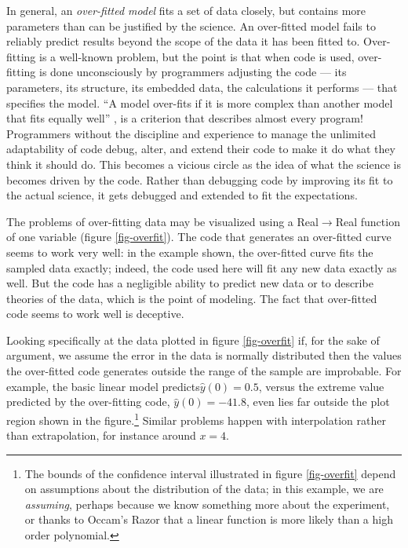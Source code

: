 \documentclass[11pt]{article}
\begin{document}
In general, an \emph{over-fitted model\/} fits a set of data closely, but contains more parameters than can be justified by the science. An over-fitted model fails to reliably predict results beyond the scope of the data it has been fitted to. Over-fitting is a well-known problem, but the point is that when code is used, over-fitting is done unconsciously by programmers adjusting the code --- its parameters, its structure, its embedded data, the calculations it performs --- that specifies the model. ``A model over-fits if it is  more complex than another model that fits equally well'' \cite{over-fit}, is a criterion that describes almost every program! Programmers without the discipline and experience to manage the unlimited adaptability of code debug, alter, and extend their code to make it do what they think it should do. This becomes a vicious circle as the idea of what the science is becomes driven by the code. Rather than debugging code by improving its fit to the actual science, it gets debugged and extended to fit the expectations.  

The problems of over-fitting data may be visualized using a Real$\rightarrow$Real function of one variable (figure \ref{fig-overfit}). The code that generates an over-fitted curve seems to work very well: in the example shown, the over-fitted curve fits the sampled data exactly; indeed, the code used here will fit any new data exactly as well. But the code has a negligible ability to predict new data or to describe theories of the data, which is the point of modeling. The fact that over-fitted code seems to work well is deceptive.

Looking specifically at the data plotted in figure \ref{fig-overfit} if, for the sake of argument, we assume the error in the data is normally distributed then the values the over-fitted code generates outside the range of the sample are improbable. For example, the basic linear model predicts$\hat{y}(0)=0.5$, versus the extreme value predicted by the over-fitting code, $\hat{y}(0)=-41.8$,  even lies far outside the plot region shown in the figure.\footnote{The bounds of the confidence interval illustrated in figure \ref{fig-overfit} depend on assumptions about the distribution of the data; in this example, we are \emph{assuming}, perhaps because we know something more about the experiment, or thanks to Occam's Razor that a linear function is more likely than a high order polynomial.} Similar problems happen with interpolation rather than extrapolation, for instance around $x=4$.
\end{document}

